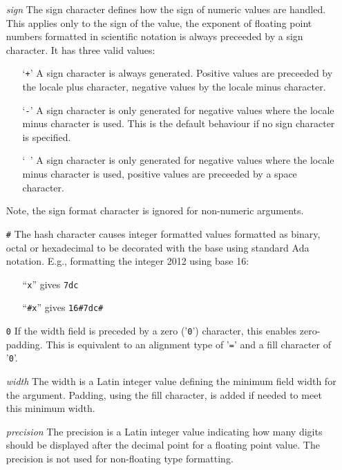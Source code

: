 \begin{itemize}
\item[\textit{sign}]
    The sign character defines how the sign of numeric values are handled.
    This applies only to the sign of the value, the exponent of floating
    point numbers formatted in scientific notation is always preceeded by
    a sign character.  It has three valid values:
    \begin{itemize}
    \item[`\texttt{+}'] A sign character is always generated.  Positive values
        are preceeded by the locale plus character, negative values by the
        locale minus character.
    \item[`\texttt{-}'] A sign character is only generated for negative values
        where the locale minus character is used.  This is the default
        behaviour if no sign character is specified.
    \item[`\texttt{ }'] A sign character is only generated for negative values
        where the locale minus character is used, positive values are preceeded
        by a space character.
    \end{itemize}
    Note, the sign format character is ignored for non-numeric arguments.

\item[\texttt{\#}]
    The hash character causes integer formatted values formatted as binary,
    octal or hexadecimal to be decorated with the base using standard Ada
    notation.  E.g., formatting the integer 2012 using base 16:
    \begin{itemize}
    \item[``\texttt{x}''] gives \verb|7dc|
    \item[``\texttt{\#x}''] gives \verb|16#7dc#|
    \end{itemize}

\item[\texttt{0}]
    If the width field is preceded by a zero ('\texttt{0}') character, this
    enables zero-padding. This is equivalent to an alignment type of
    '\texttt{=}' and a fill character of '\texttt{0}'.

\item[\textit{width}]
    The width is a Latin integer value defining the minimum field width for
    the argument.  Padding, using the fill character, is added if needed to
    meet this minimum width.

\item[\textit{precision}]
    The precision is a Latin integer value indicating how many digits
    should be displayed after the decimal point for a floating point
    value.  The precision is not used for non-floating type formatting.


\end{itemize}
